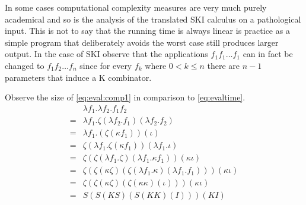 \documentclass[11pt,oneside,a4paper]{report}
\begin{document}
In some cases computational complexity measures are very much purely academical and so is the analysis of the translated SKI calculus on a pathological input.
This is not to say that the running time is always linear is practice as a simple program that deliberately avoids the worst case still produces larger output.
In the case of SKI observe that the applications $f_1 f_1 \dots f_1$ can in fact be changed to $f_1 f_2 \dots f_n$ since for every $f_k$ where $0 < k \leq n$ there are $n - 1$ parameters that induce a K combinator.
\begin{exmp}
    Observe the size of \autoref{eq:eval:comp1} in comparison to \autoref{eq:evaltime}.
\begin{align}
    &\lambda f_1 . \lambda f_2 . f_1 f_2 \label{eq:eval:comp1}\\
    =&\lambda f_1 . \zeta(\lambda f_2 . f_1)(\lambda f_2 . f_2) \tag*{} \\
    =&\lambda f_1 . (\zeta(\kappa f_1))(\iota) \tag*{} \\
    =&\zeta (\lambda f_1 . \zeta (\kappa f_1)) (\lambda f_1 . \iota) \tag*{} \\
    =&\zeta (\zeta (\lambda f_1 . \zeta) (\lambda f_1 . \kappa f_1)) (\kappa \iota) \tag*{} \\
    =&\zeta (\zeta (\kappa \zeta) (\zeta (\lambda f_1 . \kappa) (\lambda f_1 . f_1))) (\kappa \iota) \tag*{} \\
    =&\zeta (\zeta (\kappa \zeta) (\zeta (\kappa \kappa) (\iota))) (\kappa \iota) \tag*{} \\
    =&S (S (K S) (S (K K) (I))) (K I) \tag*{}
\end{align}
\end{exmp}
\end{document}

